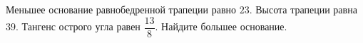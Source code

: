 \begin{ex}
	\begin{condition}
		Меньшее основание равнобедренной трапеции равно \( 23 \). Высота трапеции равна \( 39 \). Тангенс острого угла равен \( \dfrac{13}{8} \).  Найдите большее основание.
	\end{condition}
\end{ex}